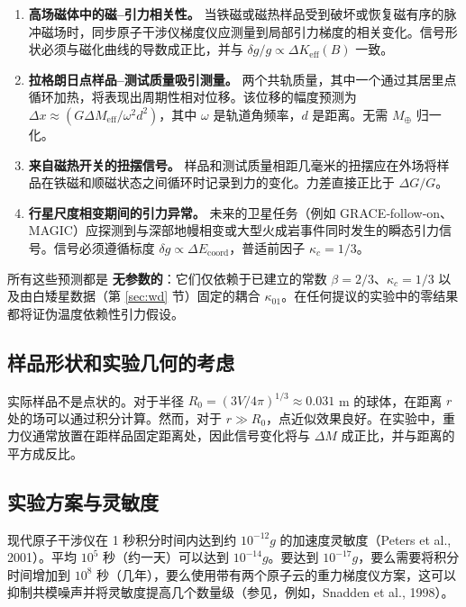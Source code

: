 \documentclass[12pt]{article}
\theoremstyle{remark}
\begin{document}
	\begin{enumerate}
		\item \textbf{高场磁体中的磁–引力相关性。}
		当铁磁或磁热样品受到破坏或恢复磁有序的脉冲磁场时，同步原子干涉仪梯度仪应测量到局部引力梯度的相关变化。信号形状必须与磁化曲线的导数成正比，并与 $\delta g/g \propto \Delta K_{\mathrm{eff}}(B)$ 一致。
		\item \textbf{拉格朗日点样品–测试质量吸引测量。}
		两个共轨质量，其中一个通过其居里点循环加热，将表现出周期性相对位移。该位移的幅度预测为 $\Delta x \approx (G \Delta M_{\mathrm{eff}} / \omega^2 d^2)$，其中 $\omega$ 是轨道角频率，$d$ 是距离。无需 $M_\oplus$ 归一化。
		\item \textbf{来自磁热开关的扭摆信号。}
		样品和测试质量相距几毫米的扭摆应在外场将样品在铁磁和顺磁状态之间循环时记录到力的变化。力差直接正比于 $\Delta G/G$。
		\item \textbf{行星尺度相变期间的引力异常。}
		未来的卫星任务（例如 GRACE‑follow‑on、MAGIC）应探测到与深部地幔相变或大型火成岩事件同时发生的瞬态引力信号。信号必须遵循标度 $\delta g \propto \Delta E_{\mathrm{coord}}$，普适前因子 $\kappa_c = 1/3$。
	\end{enumerate}
	
	所有这些预测都是 \textbf{无参数的}：它们仅依赖于已建立的常数 $\beta = 2/3$、$\kappa_c = 1/3$ 以及由白矮星数据（第 \ref{sec:wd} 节）固定的耦合 $\kappa_{01}$。在任何提议的实验中的零结果都将证伪温度依赖性引力假设。
	
	
	\subsection{样品形状和实验几何的考虑}
	\label{subsec:lab-geometry}
	
	实际样品不是点状的。对于半径 $R_0 = (3V/4\pi)^{1/3} \approx 0.031$ m 的球体，在距离 $r$ 处的场可以通过积分计算。然而，对于 $r \gg R_0$，点近似效果良好。在实验中，重力仪通常放置在距样品固定距离处，因此信号变化将与 $\Delta M$ 成正比，并与距离的平方成反比。
	
	\subsection{实验方案与灵敏度}
	\label{subsec:lab-scheme}
	
	现代原子干涉仪在 1 秒积分时间内达到约 $10^{-12}g$ 的加速度灵敏度（Peters et al., 2001）。平均 $10^5$ 秒（约一天）可以达到 $10^{-14}g$。要达到 $10^{-17}g$，要么需要将积分时间增加到 $10^8$ 秒（几年），要么使用带有两个原子云的重力梯度仪方案，这可以抑制共模噪声并将灵敏度提高几个数量级（参见，例如，Snadden et al., 1998）。
	
\end{document}
